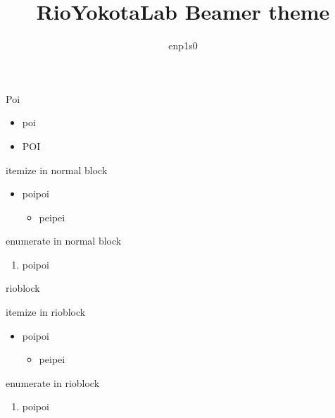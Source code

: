 \documentclass[dvipdfmx,14pt,professional font,aspectratio=169]{beamer}
\title{RioYokotaLab Beamer theme}
\author{enp1s0}
\begin{document}
\maketitle

\begin{frame}{Poi}
	\begin{itemize}
		\item poi
		\item \alert{POI}
	\end{itemize}
	\begin{block}{itemize in normal block}
		\begin{itemize}
			\item poipoi
				\begin{itemize}
					\item peipei
				\end{itemize}
		\end{itemize}
	\end{block}
	\begin{block}{enumerate in normal block}
		\begin{enumerate}
			\item poipoi
		\end{enumerate}
	\end{block}
\end{frame}
\begin{frame}{rioblock}
	\begin{rioblock}{itemize in rioblock}
		\begin{itemize}
			\item poipoi
				\begin{itemize}
					\item peipei
				\end{itemize}
		\end{itemize}
	\end{rioblock}
	\begin{rioblock}{enumerate in rioblock}
		\begin{enumerate}
			\item poipoi
		\end{enumerate}
	\end{rioblock}
\end{frame}
\end{document}
